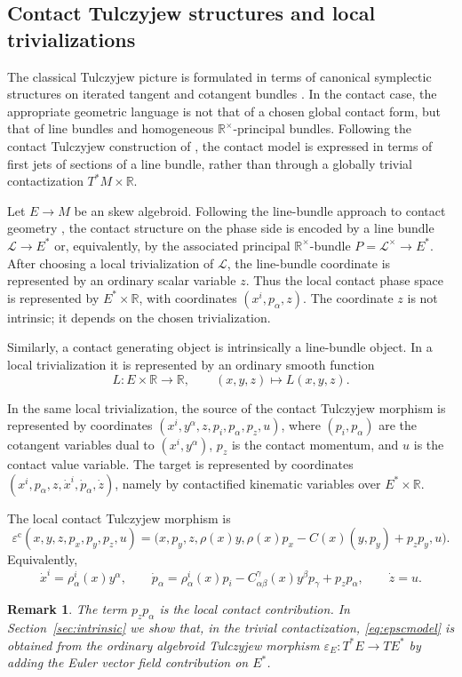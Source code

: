 \documentclass[10pt,a4paper]{amsart}
\newtheorem{remark}[theorem]{Remark}
\newcommand{\R}{\mathbb{R}}
\newcommand{\epsc}{\varepsilon^{\mathrm c}}
\begin{document}
\subsection{Contact Tulczyjew structures and local trivializations}
\label{sec:contact-structure-local}

The classical Tulczyjew picture is formulated in terms of canonical symplectic
structures on iterated tangent and cotangent bundles \cite{Tulczyjew1976}. In the
contact case, the appropriate geometric language is not that of a chosen global
contact form, but that of line bundles and homogeneous
\(\mathbb R^\times\)-principal bundles. Following the contact Tulczyjew
construction of \cite{GG2024}, the contact model is expressed in terms of first
jets of sections of a line bundle, rather than through a globally trivial
contactization \(T^*M\times\mathbb R\).

Let \(E \to M\) be an skew algebroid. Following the line-bundle approach to
contact geometry \cite{GG2024}, the contact structure on the phase side is encoded
by a line bundle $\mathcal L \rightarrow E^*$ or, equivalently, by the associated principal \(\mathbb R^\times\)-bundle $P=\mathcal L^\times\rightarrow E^*$.
After choosing a local trivialization of \(\mathcal L\), the line-bundle coordinate
is represented by an ordinary scalar variable \(z\). Thus the local contact phase
space is represented by \(E^*\times\mathbb R\), with coordinates
\((x^i,p_\alpha,z)\). The coordinate \(z\) is not intrinsic; it depends on the
chosen trivialization.

Similarly, a contact generating object is intrinsically a line-bundle
object. In a local trivialization it is represented by an ordinary smooth
function
\[
        L:E\times\R\rightarrow \R,
        \qquad
        (x,y,z)\mapsto L(x,y,z).
\]


In the same local trivialization, the source of the contact Tulczyjew morphism is represented by coordinates $(x^i,y^\alpha,z,p_i,p_\alpha,p_z,u)$, where \((p_i,p_\alpha)\) are the cotangent variables dual to
\((x^i,y^\alpha)\), \(p_z\) is the contact momentum, and \(u\) is the
contact value variable. The target is represented by coordinates
$(x^i,p_\alpha,z,\dot x^i,\dot p_\alpha,\dot z)$, namely by contactified kinematic variables over \(E^*\times\R\).

The local contact Tulczyjew morphism is
\begin{equation}
\epsc(x,y,z,p_x,p_y,p_z,u)
=
\bigl(
 x,p_y,z,
 \rho(x)y,
 \rho(x)p_x-C(x)(y,p_y)+p_zp_y,
 u
\bigr).
\label{eq:epscmodel}
\end{equation}
Equivalently,
\[
        \dot x^i
        =
        \rho^i_{\alpha}(x)y^\alpha,
        \qquad
        \dot p_\alpha
        =
        \rho^i_{\alpha}(x)p_i
        -
        C^\gamma_{\alpha\beta}(x)y^\beta p_\gamma
        +
        p_zp_\alpha,
        \qquad
        \dot z=u .
\]
\begin{remark}
The term \(p_zp_\alpha\) is the local contact contribution. In
Section~\ref{sec:intrinsic} we show that, in the trivial
contactization, \eqref{eq:epscmodel} is obtained from the ordinary
algebroid Tulczyjew morphism \(\varepsilon_E:T^*E\to TE^*\) by adding the
Euler vector field contribution on \(E^*\).
\end{remark}
\end{document}
